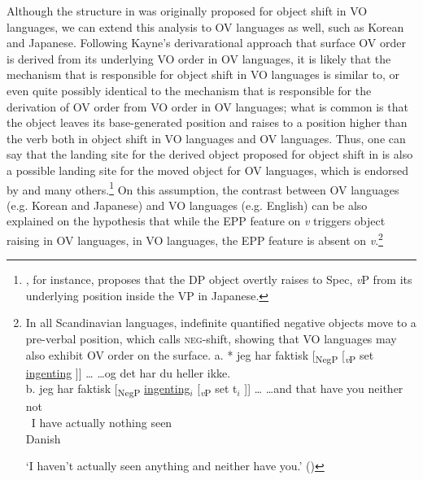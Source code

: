 Although the structure in  was originally proposed for object shift in \ac{VO} languages, we can extend this analysis to \ac{OV} languages as well, such as Korean and Japanese. Following Kayne’s derivarational approach that surface \ac{OV} order is derived from its underlying \ac{VO} order in \ac{OV} languages, it is likely that the mechanism that is responsible for object shift in \ac{VO} languages is similar to, or even quite possibly identical to the mechanism that is responsible for the derivation of \ac{OV} order from \ac{VO} order in \ac{OV} languages; what is common is that the object leaves its base-generated position and raises to a position higher than the verb both in object shift in \ac{VO} languages and \ac{OV} languages. Thus, one can say that the landing site for the derived object proposed for object shift in  is also a possible landing site for the moved object for \ac{OV} languages, which is endorsed by \citet{Kayne2003} and many others.\footnote{\citet{Ochi2009}, for instance, proposes that the \ac{DP} object overtly raises to Spec, \textit{v}P from its underlying position inside the \ac{VP} in Japanese.} On this assumption, the contrast between \ac{OV} languages (e.g. Korean and Japanese) and \ac{VO} languages (e.g. English) can be also explained on the hypothesis that while the \ac{EPP} feature on \textit{v} triggers object raising in \ac{OV} languages, in \ac{VO} languages, the \ac{EPP} feature is absent on \textit{v}.\footnote{In
    all Scandinavian languages, indefinite quantified negative objects move to a pre-verbal position, which \citet{Christensen2004} calls \textsc{neg}-shift, showing that \ac{VO} languages may also exhibit \ac{OV} order on the surface.
    \ea\label{ex:fn33}
    \glll a. {*} jeg har faktisk [\textsubscript{NegP} {} [\textsubscript{\textit{v}P} set \uline{ingenting} ]] {\ldots} {\ldots og det har du heller ikke}.\\
          b. {} jeg har faktisk [\textsubscript{NegP}  \uline{ingenting}$_i$  [\textsubscript{\textit{v}P}  set t$_i$ ]] {\ldots} {\ldots and that have you neither not}\\
          {} {} ~I have actually {} nothing {} seen {}  {}\\\hfill Danish\vspace*{-\baselineskip}

    \glt `I haven't actually seen anything and neither have you.'  (\citealt[1, (1)]{Christensen2004})
    \z

}
